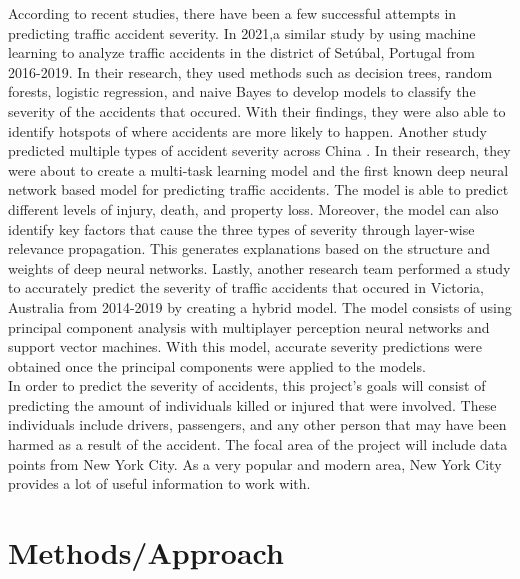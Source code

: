 \documentclass[conference]{IEEEtran}
\begin{document}
According to recent studies, there have been a few successful attempts in predicting traffic accident severity. In 2021,a similar study by using machine learning to analyze traffic accidents in the district of Setúbal, Portugal from 2016-2019\cite{santos_machine_2021}. In their research, they used methods such as decision trees, random forests, logistic regression, and naive Bayes to develop models to classify the severity of the accidents that occured. With their findings, they were also able to identify hotspots of where accidents are more likely to happen. Another study predicted multiple types of accident severity across China \cite{yang_predicting_2022}. In their research, they were about to create a multi-task learning model and the first known deep neural network based model for predicting traffic accidents. The model is able to predict different levels of injury, death, and property loss. Moreover, the model can also identify key factors that cause the three types of severity through layer-wise relevance propagation. This generates explanations based on the structure and weights of deep neural networks. Lastly, another research team performed a study to accurately predict the severity of traffic accidents that occured in Victoria, Australia from 2014-2019  by creating a hybrid model\cite{assi_traffic_2020}. The model consists of using principal component analysis with multiplayer perception neural networks and support vector machines. With this model, accurate severity predictions were obtained once the principal components were applied to the models.\\
In order to predict the severity of accidents, this project’s goals will consist of predicting the amount of individuals killed or injured that were involved. These individuals include drivers, passengers, and any other person that may have been harmed as a result of the accident. The focal area of the project will include data points from New York City. As a very popular and modern area, New York City provides a lot of useful information to work with.
\section{Methods/Approach}
\end{document}
